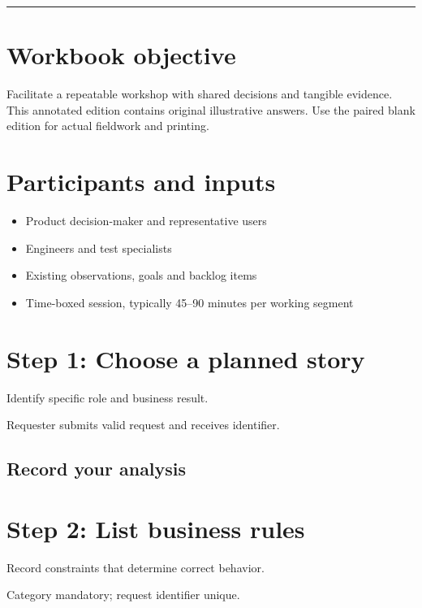 \documentclass[11pt,letterpaper]{article}
\begin{document}
\tableofcontents\medskip\noindent\rule{\linewidth}{0.4pt}\medskip
\section{Workbook objective}
Facilitate a repeatable workshop with shared decisions and tangible evidence. This annotated edition contains original illustrative answers. Use the paired blank edition for actual fieldwork and printing.

\section{Participants and inputs}
\begin{itemize}[leftmargin=*,itemsep=2pt]
\item Product decision-maker and representative users
\item Engineers and test specialists
\item Existing observations, goals and backlog items
\item Time-boxed session, typically 45–90 minutes per working segment
\end{itemize}
\section{Step 1: Choose a planned story}
Identify specific role and business result.

\begin{tcolorbox}[colback=tealback,colframe=navy,title={Illustration},breakable]
Requester submits valid request and receives identifier.

\end{tcolorbox}
\subsection{Record your analysis}
\section{Step 2: List business rules}
Record constraints that determine correct behavior.

\begin{tcolorbox}[colback=tealback,colframe=navy,title={Illustration},breakable]
Category mandatory; request identifier unique.

\end{tcolorbox}
\end{document}
